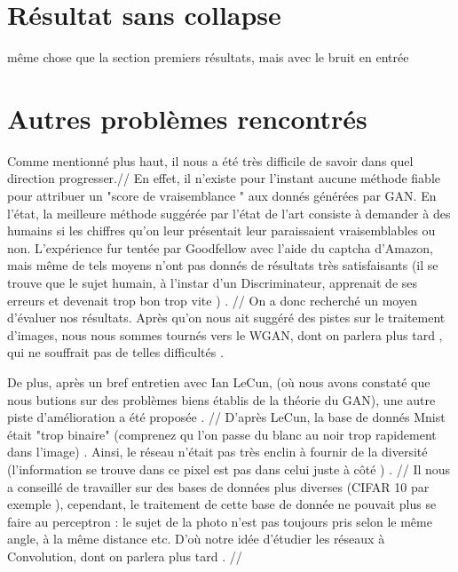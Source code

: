 	



\section{Résultat sans collapse}
{même chose que la section premiers résultats, mais avec le bruit en entrée}
\section{Autres problèmes rencontrés } 
Comme mentionné plus haut, il nous a été très difficile de savoir dans quel direction progresser.//
En effet, il n'existe pour l'instant aucune méthode fiable pour attribuer un "score de vraisemblance "  aux donnés générées par GAN. En l'état, la meilleure méthode suggérée par l'état de l'art consiste à demander à des humains si les chiffres qu'on leur présentait leur paraissaient vraisemblables ou non. L'expérience fur tentée par Goodfellow avec l'aide du captcha d'Amazon, mais même de tels moyens n'ont pas donnés de résultats très satisfaisants (il se trouve que le sujet humain, à l'instar d'un Discriminateur, apprenait de ses erreurs et devenait trop bon trop vite ) . //
On a donc recherché un moyen d'évaluer nos résultats. Après qu'on nous ait suggéré des pistes sur le traitement d'images, nous nous sommes tournés vers le WGAN, dont on parlera plus tard , qui ne souffrait pas de telles difficultés . 

De plus, après un bref entretien avec Ian LeCun, (où nous avons constaté que nous butions sur des problèmes biens établis de la théorie du GAN), une autre piste d'amélioration a été proposée . //
D'après LeCun, la base de donnés Mnist était "trop binaire" (comprenez qu l'on passe du blanc au noir trop rapidement dans l'image) . Ainsi, le réseau n'était pas très enclin à fournir de la diversité (l'information se trouve dans ce pixel est pas dans celui juste à côté ) . //
Il nous  a conseillé de travailler sur des bases de données plus diverses (CIFAR 10 par exemple ), cependant, le traitement de cette base de donnée ne pouvait plus se faire au perceptron : le sujet de la photo n'est pas toujours pris selon le même angle, à la même distance etc. D'où notre idée d'étudier les réseaux à Convolution, dont on parlera plus tard . //

